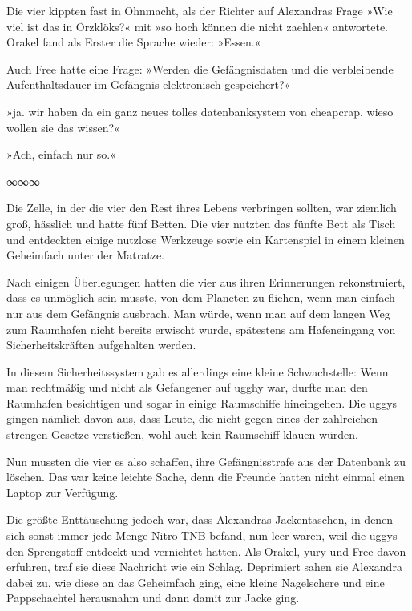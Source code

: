 Die vier kippten fast in Ohnmacht, als der Richter auf Alexandras Frage »Wie viel ist das in Örzklöks?« mit »so hoch können die nicht zaehlen« antwortete. Orakel fand als Erster die Sprache wieder: »Essen.«

Auch Free hatte eine Frage: »Werden die Gefängnisdaten und die verbleibende Aufenthaltsdauer im Gefängnis elektronisch gespeichert?«

»ja. wir haben da ein ganz neues tolles datenbanksystem von cheapcrap. wieso wollen sie das wissen?«

»Ach, einfach nur so.«

\begin{center}
    ∞∞∞
\end{center}

Die Zelle, in der die vier den Rest ihres Lebens verbringen sollten, war ziemlich groß, hässlich und hatte fünf Betten. Die vier nutzten das fünfte Bett als Tisch und entdeckten einige nutzlose Werkzeuge sowie ein Kartenspiel in einem kleinen Geheimfach unter der Matratze.

Nach einigen Überlegungen hatten die vier aus ihren Erinnerungen rekonstruiert, dass es unmöglich sein musste, von dem Planeten zu fliehen, wenn man einfach nur aus dem Gefängnis ausbrach. Man würde, wenn man auf dem langen Weg zum Raumhafen nicht bereits erwischt wurde, spätestens am Hafeneingang von Sicherheitskräften aufgehalten werden.

In diesem Sicherheitssystem gab es allerdings eine kleine Schwachstelle: Wenn man rechtmäßig und nicht als Gefangener auf ugghy war, durfte man den Raumhafen besichtigen und sogar in einige Raumschiffe hineingehen. Die uggys gingen nämlich davon aus, dass Leute, die nicht gegen eines der zahlreichen strengen Gesetze verstießen, wohl auch kein Raumschiff klauen würden.

Nun mussten die vier es also schaffen, ihre Gefängnisstrafe aus der Datenbank zu löschen. Das war keine leichte Sache, denn die Freunde hatten nicht einmal einen Laptop zur Verfügung.

Die größte Enttäuschung jedoch war, dass Alexandras Jackentaschen, in denen sich sonst immer jede Menge Nitro-TNB befand, nun leer waren, weil die uggys den Sprengstoff entdeckt und vernichtet hatten. Als Orakel, yury und Free davon erfuhren, traf sie diese Nachricht wie ein Schlag. Deprimiert sahen sie Alexandra dabei zu, wie diese an das Geheimfach ging, eine kleine Nagelschere und eine Pappschachtel herausnahm und dann damit zur Jacke ging.

